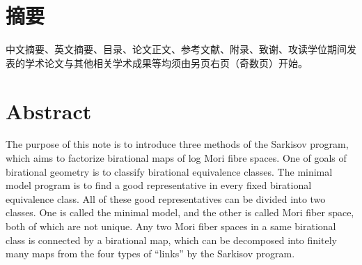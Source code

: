 

\maketitle%
\MAKETITLE%
\makedeclaration%
\intobmk\chapter*{摘\quad 要}%
\setcounter{page}{1}%

中文摘要、英文摘要、目录、论文正文、参考文献、附录、致谢、攻读学位期间发表的学术论文与其他相关学术成果等均须由另页右页（奇数页）开始。

\intobmk\chapter*{Abstract}%

The purpose of this note is to introduce three methods of the Sarkisov program, which aims to factorize birational maps of log Mori fibre spaces. One of goals of birational geometry is to classify birational equivalence classes. The
minimal model program  is to find a good representative in every fixed
birational equivalence class. All of these good representatives can be divided
into two classes. One is called the minimal model, and the other is called Mori fiber
space, both of  which are not unique. Any two Mori fiber spaces in a same birational class is connected by a birational map, which can be decomposed into finitely many maps from the four types of “links” by the Sarkisov program. 




\pagestyle{enfrontmatterstyle}%
\cleardoublepage\pagestyle{frontmatterstyle}%

